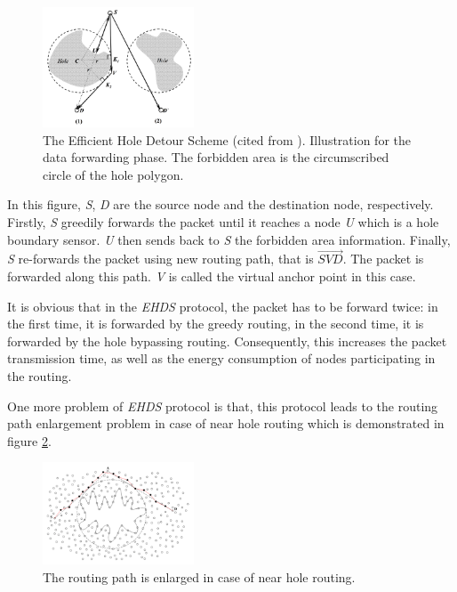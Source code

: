 \begin{figure}[!htb]
\centering
\includegraphics[width=0.4\textwidth]{Chapter3/Chapter3Figs/fig-circle2.png}
\caption{The Efficient Hole Detour Scheme (cited from \cite{ehds}). Illustration for the data forwarding phase. The forbidden area is the circumscribed circle of the hole polygon.}
\label{fig-circle2}
\end{figure} 

In this figure, \emph{S}, \emph{D} are the source node and the destination node, respectively. Firstly, \emph{S} greedily forwards the packet until it reaches a node \emph{U} which is a hole boundary sensor. \emph{U} then sends back to \emph{S} the forbidden area information. Finally, \emph{S} re-forwards the packet using new routing path, that is $\overrightarrow{SVD}$. The packet is forwarded along this path. \emph{V} is called the virtual anchor point in this case.

It is obvious that in the \emph{EHDS} protocol, the packet has to be forward twice: in the first time, it is forwarded by the greedy routing, in the second time, it is forwarded by the hole bypassing routing. Consequently, this increases the packet transmission time, as well as the energy consumption of nodes participating in the routing. 

One more problem of \emph{EHDS} protocol is that, this protocol leads to the routing path enlargement problem in case of near hole routing which is demonstrated in figure \ref{fig-circle-problem}.
\begin{figure}[!htb]
\centering
\includegraphics[width=0.4\textwidth]{Chapter3/Chapter3Figs/fig-circle-problem.png}
\caption{The routing path is enlarged in case of near hole routing.}
\label{fig-circle-problem}
\end{figure}


